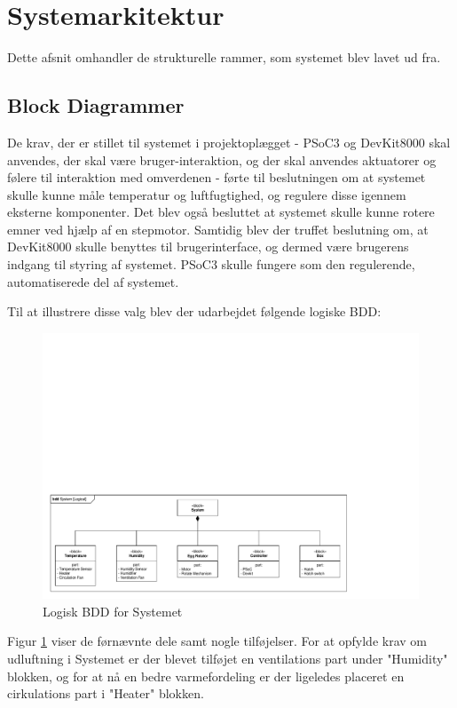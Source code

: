 \section{Systemarkitektur}
Dette afsnit omhandler de strukturelle rammer, som systemet blev lavet ud fra.

\subsection{Block Diagrammer}
De krav, der er stillet til systemet i projektoplægget - PSoC3 og DevKit8000 skal anvendes, der skal være bruger-interaktion, og der skal anvendes aktuatorer og følere til interaktion med omverdenen - førte til beslutningen om at systemet skulle kunne måle temperatur og luftfugtighed, og regulere disse igennem eksterne komponenter. Det blev også besluttet at systemet skulle kunne rotere emner ved hjælp af en stepmotor. Samtidig blev der truffet beslutning om, at DevKit8000 skulle benyttes til brugerinterface, og dermed være brugerens indgang til styring af systemet. PSoC3 skulle fungere som den regulerende, automatiserede del af systemet.

Til at illustrere disse valg blev der udarbejdet følgende logiske BDD:

\begin{figure}[H]
\centering
\includegraphics[width=\linewidth,page=1,trim=5mm 5mm 55mm 125mm]{./7_projektbeskrivelse/systemarkitektur/diagrammer/SYSML_Diagrammer_v4.pdf}
\caption[Diagram]{Logisk BDD for Systemet}
\label{fig:BDDLogisk}
\end{figure}

Figur \ref{fig:BDDLogisk} viser de førnævnte dele samt nogle tilføjelser. For at opfylde krav om udluftning i Systemet er der blevet tilføjet en ventilations part under "Humidity" blokken, og for at nå en bedre varmefordeling er der ligeledes placeret en cirkulations part i "Heater" blokken.

